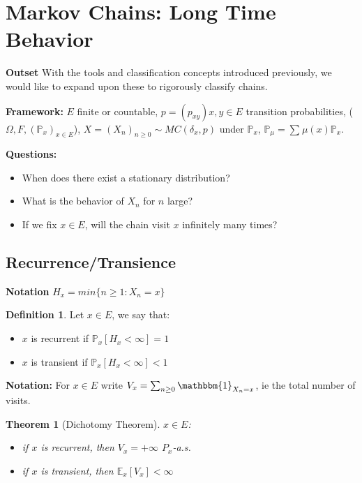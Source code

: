 \documentclass[12pt]{book}
\newtheorem{theorem}{Theorem}[section]
\theoremstyle{definition}
\newtheorem{defn}{Definition}[section]
\theoremstyle{remark}
\begin{document}
\newpage
\section{Markov Chains: Long Time Behavior}

\noindent \textbf{Outset} With the tools and classification concepts introduced previously, we would like to expand upon these to rigorously classify chains.

\noindent \textbf{Framework:} $E$ finite or countable, $p=(p_{xy})x,y \in E$ transition probabilities, ($\Omega, F, (\mathbb{P}_x) _{x \in E}$), $X=(X_n)_{n\geq 0} \sim MC(\delta_x,p)$ under $\mathbb{P}_x$, $\mathbb{P}_\mu = \sum_{}^{} \mu (x)\mathbb{P}_x$.

\noindent \textbf{Questions:} 
\begin{itemize}
	\item When does there exist a stationary distribution?
	\item What is the behavior of $X_n$ for $n$ large?
	\item If we fix $x \in E$, will the chain visit $x$ infinitely many times?
\end{itemize}

\subsection{Recurrence/Transience}

\textbf{Notation} $H_x = min\{n\geq 1: X_n=x\}$
\begin{defn}
	Let $x \in E$, we say that:
\begin{itemize}
	\item $x$ is recurrent if $\mathbb{P}_{x} \left[ H_x<\infty \right]=1 $
	\item $x$ is transient if $\mathbb{P}_{x} \left[ H_x<\infty \right] <1$ 
\end{itemize}

\end{defn}
\noindent
\textbf{Notation:} For $x \in E$ write $V_x=\sum_{n\geq 0}^{} \mathbbm{1}_{X_n=x} $, ie the total number of visits.

\begin{theorem}[Dichotomy Theorem]
	$x \in E$:
\begin{itemize}
	\item if $x$ is recurrent, then $V_{x}=+\infty$ $P_x$-a.s.
	\item if $x$ is transient, then $\mathbb{E}_{x} \left[ V_x \right] <\infty$
\end{itemize}
\end{theorem}
\end{document}
